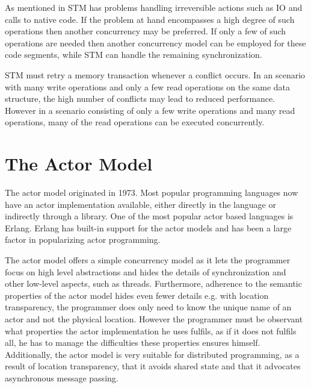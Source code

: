 As mentioned in  STM has problems handling irreversible actions such as \ac{IO} and calls to native code. If the problem at hand encompasses a high degree of such operations then another concurrency may be preferred. If only a few of such operations are needed then another concurrency model can be employed for these code segments, while \ac{STM} can handle the remaining synchronization.

\ac{STM} must retry a memory transaction whenever a conflict occurs. In an scenario with many write operations and only a few read operations on the same data structure, the high number of conflicts may lead to reduced performance\cite[p. 311]{subramaniam2011programming}. However in a scenario consisting of only a few write operations and many read operations, many of the read operations can be executed concurrently.

\section{The Actor Model}\label{sec:choose_Actor}
The actor model originated in 1973\cite[p. 14]{haller2012actors}. Most popular programming languages now have an actor implementation available\cite[p. 152]{sevenModels}, either directly in the language or indirectly through a library. One of the most popular actor based languages is Erlang. Erlang has built-in support for the actor models and has been a large factor in popularizing actor programming\cite[p. 152]{sevenModels}.

The actor model offers a simple concurrency model as it lets the programmer focus on high level abstractions and hides the details of synchronization and other low-level aspects, such as threads. Furthermore, adherence to the semantic properties of the actor model hides even fewer details e.g. with location transparency, the programmer does only need to know the unique name of an actor and not the physical location. However the programmer must be observant what properties the actor implementation he uses fulfils, as if it does not fulfils all, he has to manage the difficulties these properties ensures himself. Additionally, the actor model is very suitable for distributed programming, as a result of location transparency, that it avoids shared state and that it advocates asynchronous message passing.

